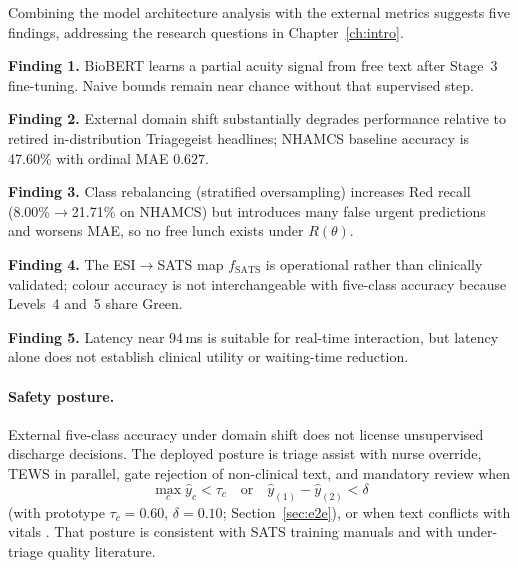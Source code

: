 Combining the model architecture analysis with the external metrics suggests five findings, addressing the research questions in Chapter~\ref{ch:intro}.

\textbf{Finding 1.} BioBERT learns a partial acuity signal from free text after Stage~3 fine-tuning. Naive bounds remain near chance without that supervised step.

\textbf{Finding 2.} External domain shift substantially degrades performance relative to retired in-distribution Triagegeist headlines; NHAMCS baseline accuracy is 47.60\% with ordinal MAE \(0.627\).

\textbf{Finding 3.} Class rebalancing (stratified oversampling) increases Red recall (8.00\%\(\to\)21.71\% on NHAMCS) but introduces many false urgent predictions and worsens MAE, so no free lunch exists under \(R(\theta)\).

\textbf{Finding 4.} The ESI\(\to\)SATS map \(f_{\mathrm{SATS}}\) is operational rather than clinically validated; colour accuracy is not interchangeable with five-class accuracy because Levels~4 and~5 share Green.

\textbf{Finding 5.} Latency near 94\,ms is suitable for real-time interaction, but latency alone does not establish clinical utility or waiting-time reduction.

\paragraph{Safety posture.}
External five-class accuracy under domain shift does not license unsupervised discharge decisions. The deployed posture is triage assist with nurse override, TEWS in parallel, gate rejection of non-clinical text, and mandatory review when
\[
  \max_c\hat{y}_c < \tau_c
  \quad\text{or}\quad
  \hat{y}_{(1)}-\hat{y}_{(2)} < \delta
\]
(with prototype \(\tau_c=0.60\), \(\delta=0.10\); Section~\ref{sec:e2e}), or when text conflicts with vitals \citep{stewart2023nlp,Berkowitz2019}. That posture is consistent with SATS training manuals and with under-triage quality literature.
